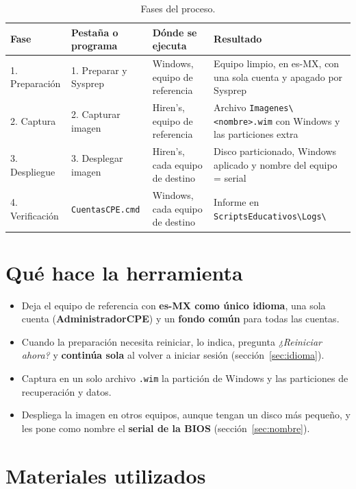 \documentclass[11pt,a4paper]{report}
\newcommand{\bs}{\textbackslash\allowbreak{}}
\begin{document}
\begin{table}[H]
  \centering
  \small
  \begin{tabularx}{\textwidth}{@{}l l l >{\raggedright\arraybackslash}X@{}}
    \toprule
    \textbf{Fase} & \textbf{Pestaña o programa} & \textbf{Dónde se ejecuta} & \textbf{Resultado} \\
    \midrule
    1. Preparación & 1. Preparar y Sysprep & Windows, equipo de referencia &
      Equipo limpio, en es-MX, con una sola cuenta y apagado por Sysprep \\
    2. Captura & 2. Capturar imagen & Hiren's, equipo de referencia &
      Archivo \texttt{Imagenes\bs <nombre>.wim} con Windows y las particiones extra \\
    3. Despliegue & 3. Desplegar imagen & Hiren's, cada equipo de destino &
      Disco particionado, Windows aplicado y nombre del equipo = serial \\
    4. Verificación & \texttt{CuentasCPE.cmd} & Windows, cada equipo de destino &
      Informe en \texttt{ScriptsEducativos\bs Logs\bs} \\
    \bottomrule
  \end{tabularx}
  \caption{Fases del proceso.}
\end{table}

\section{Qué hace la herramienta}

\begin{itemize}
  \item Deja el equipo de referencia con \textbf{es-MX como único idioma},
        una sola cuenta (\textbf{AdministradorCPE}) y un \textbf{fondo común}
        para todas las cuentas.
  \item Cuando la preparación necesita reiniciar, lo indica, pregunta
        \emph{¿Reiniciar ahora?} y \textbf{continúa sola} al volver a iniciar
        sesión (sección~\ref{sec:idioma}).
  \item Captura en un solo archivo \texttt{.wim} la partición de Windows y las
        particiones de recuperación y datos.
  \item Despliega la imagen en otros equipos, aunque tengan un disco más
        pequeño, y les pone como nombre el \textbf{serial de la BIOS}
        (sección~\ref{sec:nombre}).
\end{itemize}

\section{Materiales utilizados}
\end{document}
